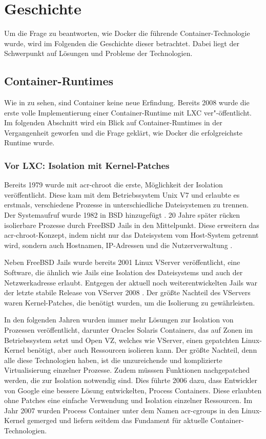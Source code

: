\chapter{Geschichte}
\label{chap:geschichte}
Um die Frage zu beantworten, wie Docker die führende Container-Technologie wurde, wird im Folgenden die Geschichte dieser betrachtet. Dabei liegt der Schwerpunkt auf Lösungen und Probleme der Technologien.
 
\section{Container-Runtimes}
\label{sec:lxc2containerd}
Wie in  zu sehen, sind Container keine neue Erfindung. Bereits 2008 wurde die erste volle Implementierung einer Container-Runtime mit LXC ver"-öffentlicht. Im folgenden Abschnitt wird ein Blick auf Container-Runtimes in der Vergangenheit geworfen und die Frage geklärt, wie Docker die erfolgreichste Runtime wurde.

\subsection{Vor LXC: Isolation mit Kernel-Patches}
\label{sec:geschichteVorLXC}

Bereits 1979 wurde mit \gls{acr-chroot} die erste, Möglichkeit der Isolation veröffentlicht. Diese kam mit dem Betriebssystem Unix V7 und erlaubte es erstmals, verschiedene Prozesse in unterschiedliche Dateisystemen zu trennen. Der Systemaufruf wurde 1982 in BSD hinzugefügt \citep{ABriefHistoryofContainers:fromthe1970sto2017}. 20 Jahre später rücken isolierbare Prozesse durch FreeBSD Jails in den Mittelpunkt. Diese erweitern das \Gls{acr-chroot}-Konzept, indem nicht nur das Dateisystem vom Host-System getrennt wird, sondern auch Hostnamen, IP-Adressen und die Nutzerverwaltung \citep{FreeBSDHandbook}. 

Neben FreeBSD Jails wurde bereits 2001 Linux VServer veröffentlicht, eine Software, die ähnlich wie Jails eine Isolation des Dateisystems und auch der Netzwerkadresse erlaubt. Entgegen der aktuell noch weiterentwickelten Jails war der letzte stabile Release von VServer 2008 \citep{PaperLinuxVServer}. Der größte Nachteil des VServers waren Kernel-Patches, die benötigt wurden, um die Isolierung zu gewährleisten.

In den folgenden Jahren wurden immer mehr Lösungen zur Isolation von Prozessen veröffentlicht, darunter Oracles Solaris Containers, das auf Zonen im Betriebssystem setzt und Open VZ, welches wie VServer, einen gepatchten Linux-Kernel benötigt, aber auch Ressourcen isolieren kann. Der größte Nachteil, denn alle diese Technologien haben, ist die unzureichende und komplizierte Virtualisierung einzelner Prozesse. Zudem müsssen Funktionen nachgepatched werden, die zur Isolation notwendig sind. Dies führte 2006 dazu, dass Entwickler von Google eine bessere Lösung entwickelten, Process Containers. Diese erlaubten ohne Patches eine einfache Verwendung und Isolation einzelner Ressourcen. Im Jahr 2007 wurden Process Container unter dem Namen \glspl{acr-cgroup} in den Linux-Kernel gemerged und liefern seitdem das Fundament für aktuelle Container-Technologien.

